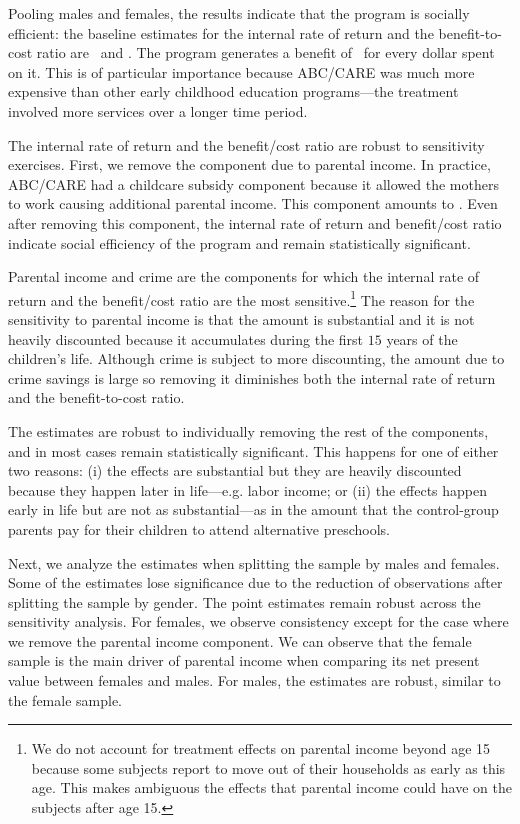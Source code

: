 Pooling males and females, the results indicate that the program is socially efficient: the baseline estimates for the internal rate of return and the benefit-to-cost ratio are \irrp\ and \bcp. The program generates a benefit of \bcp\ for every dollar spent on it. This is of particular importance because ABC/CARE was much more expensive than other early childhood education programs---the treatment involved more services over a longer time period.\citet{Elango_Hojman_etal_2016_Early-Edu}

The internal rate of return and the benefit/cost ratio are robust to sensitivity exercises. First, we remove the component due to parental income. In practice, ABC/CARE had a childcare subsidy component because it allowed the mothers to work causing additional parental income. This component amounts to \parincomenpvp. Even after removing this component, the internal rate of return and benefit/cost ratio indicate social efficiency of the program and remain statistically significant.

Parental income and crime are the components for which the internal rate of return and the benefit/cost ratio are the most sensitive.\footnote{We do not account for treatment effects on parental income beyond age 15 because some subjects report to move out of their households as early as this age. This makes ambiguous the effects that parental income could have on the subjects after age 15.} The reason for the sensitivity to parental income is that the amount is substantial and it is not heavily discounted because it accumulates during the first $15$ years of the children's life. Although crime is subject to more discounting, the amount due to crime savings is large so removing it diminishes both the internal rate of return and the benefit-to-cost ratio.

The estimates are robust to individually removing the rest of the components, and in most cases remain statistically significant. This happens for one of either two reasons: (i) the effects are substantial but they are heavily discounted because they happen later in life---e.g. labor income; or (ii) the effects happen early in life but are not as substantial---as in the amount that the control-group parents pay for their children to attend alternative preschools.

Next, we analyze the estimates when splitting the sample by males and females. Some of the estimates lose significance due to the reduction of observations after splitting the sample by gender. The point estimates remain robust across  the sensitivity analysis. For females, we observe consistency except for the case where we remove the parental income component. We can observe that the female sample is the main driver of parental income when comparing its net present value between females and males. For males, the estimates are robust, similar to the female sample.

